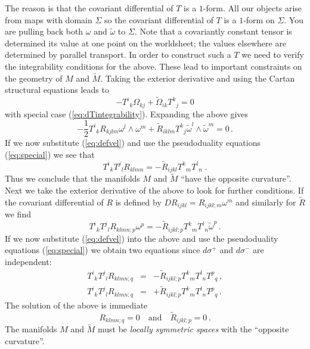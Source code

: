 \documentclass[a4paper,12pt]{article}
\newcommand{\Mtil}{\widetilde{M}}
\newcommand{\Rtil}{\widetilde{R}}
\newcommand{\half}{\frac{1}{2}}
\newcommand{\omegatil}{\tilde{\omega}}
\begin{document}
The reason is that the covariant differential of $T$ is a $1$-form. 
All our objects arise from maps with domain $\Sigma$ so the covariant
differential of $T$ is a $1$-form on $\Sigma$.  You are pulling back
both $\omega$ and $\omegatil$ to $\Sigma$.  Note that a covariantly
constant tensor is determined its value at one point on the
worldsheet; the values elsewhere are determined by parallel transport. 
In order to construct such a $T$ we need to verify the integrability
conditions for the above.  These lead to important constraints on the
geometry of $M$ and $\Mtil$.  Taking the exterior derivative and using
the Cartan structural equations leads to
$$
    -T^{i}{}_{k}\Omega_{kj} + \widetilde{\Omega}_{ik}T^{k}{}_{j}=0
$$
with special case (\ref{eq:dTintegrability}). Expanding the above gives
$$
    -\half T^{i}{}_{k}R_{kjlm}\omega^{l}\wedge\omega^{m}
    + \Rtil_{iklm}T^{k}{}_{j} \omegatil^{l}\wedge\omegatil^{m}=0\,.
$$
If we now substitute (\ref{eq:defvel}) and use the pseudoduality 
equations (\ref{eq:special}) we see that
\begin{equation}
    T^{i}{}_{k}T^{j}{}_{l}R_{klmn}= 
    -\widetilde{R}_{ijkl}T^{k}{}_{m}T^{l}{}_{n}\;.
    \label{eq:pCurv}
\end{equation}
Thus we conclude that the manifolds $M$ and $\Mtil$ ``have the 
opposite curvature''. Next we take the exterior derivative of the 
above to look for further conditions. If the covariant differential of 
$R$ is defined by $D R_{ijkl} = R_{ijkl;m}\omega^{m}$ and similarly 
for $\Rtil$ we find
$$
    T^{i}{}_{k}T^{j}{}_{l}R_{klmn;p} \omega^{p} =
    -\widetilde{R}_{ijkl;p}T^{k}{}_{m}T^{l}{}_{n}\omegatil^{p}\,.
$$
If we now substitute (\ref{eq:defvel}) into the above and use the 
pseudoduality equations (\ref{eq:special}) we obtain two equations 
since $d\sigma^{+}$ and $d\sigma^{-}$ are independent:
\begin{eqnarray*}
    T^{i}{}_{k}T^{j}{}_{l}R_{klmn;q} & = & 
    -\widetilde{R}_{ijkl;p}T^{k}{}_{m}T^{l}{}_{n} T^{p}{}_{q}\,,\\
    T^{i}{}_{k}T^{j}{}_{l}R_{klmn;q} & = & 
    +\widetilde{R}_{ijkl;p}T^{k}{}_{m}T^{l}{}_{n} T^{p}{}_{q}\,.
\end{eqnarray*}
The solution of the above is immediate
\begin{equation}
    R_{klmn;q}=0\quad\mbox{and}\quad \widetilde{R}_{ijkl;p} =0\,.
    \label{eq:DR0}
\end{equation}
The manifolds $M$ and $\Mtil$ must be \emph{locally symmetric spaces} with the 
``opposite curvature''. 
\end{document}
